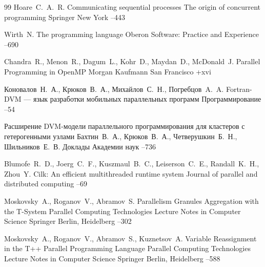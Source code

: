 \begin{thebibliography}{99}
\by  Hoare~C.~A.~R.
\paper Communicating sequential processes 
\inbook The origin of concurrent prog\-ramming
\publ Springer 
\publaddr New York
--443

\by Wirth~N. 
\paper The programming language Oberon 
\jour Software: Practice and Experience
--690

\by Chandra~R., Menon~R., Dagum~L., Kohr~D., Maydan~D., McDonald~J.
\book Parallel Programming in OpenMP
\publ Morgan Kaufmann
\publaddr San Francisco
+xvi

\by Коновалов~Н.~А., Крюков~В.~А., Михайлов~С.~Н., Погребцов~A.~A.
\paper Fortran-DVM — язык разработки мобильных параллельных программ
\jour Программирование
--54

\paper Расширение DVM-модели параллельного программирования для кластеров с гетерогенными узлами
\by Бахтин~В.~А., Крюков~В.~А., Четверушкин~Б.~Н., Шильников~Е.~В.
\jour Доклады Академии наук
–736


\by Blumofe~R.~D., Joerg~C.~F., Kuszmaul~B.~C., Leiserson~C.~E., Randall~K.~H., Zhou~Y.
\paper Cilk: An efficient multithreaded runtime system 
\jour Journal of parallel and distributed computing
--69

\by Moskovsky~A., Roganov~V., Abramov~S. 
\paper Parallelism Granules Aggregation with the T-System
\inbook Parallel Computing Technologies
\serial Lecture Notes in Computer Science
\publ Springer 
\publaddr Berlin, Heidelberg
--302

\by Moskovsky~A., Roganov~V., Abramov~S.,  Kuznetsov~A.
\paper Variable Reassignment in the T++ Parallel Programming Language
\inbook Parallel Computing Technologies
\serial Lecture Notes in Computer Science
\publ Springer 
\publaddr Berlin, Heidelberg
--588


\end{thebibliography}
